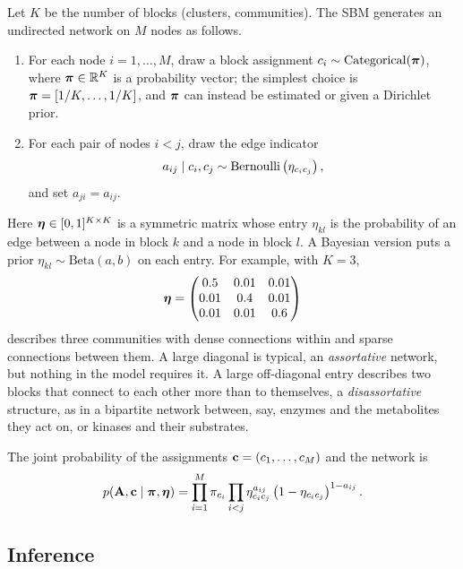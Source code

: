 Let $K$ be the number of blocks (clusters, communities). The SBM generates an undirected network on $M$ nodes as follows.
\begin{enumerate}
  \item For each node $i=1,\dots,M$, draw a block assignment $c_i\sim\operatorname{Categorical}(\boldsymbol{\pi})$, where $\boldsymbol{\pi}\in\mathbb{R}^K$ is a probability vector; the simplest choice is $\boldsymbol{\pi}=[1/K,\dots,1/K]$, and $\boldsymbol{\pi}$ can instead be estimated or given a Dirichlet prior.
  \item For each pair of nodes $i<j$, draw the edge indicator
  \begin{equation}
    a_{ij}\mid c_i,c_j \sim \operatorname{Bernoulli}\left(\eta_{c_ic_j}\right),
  \end{equation}
  and set $a_{ji}=a_{ij}$.
\end{enumerate}
Here $\boldsymbol{\eta}\in[0,1]^{K\times K}$ is a symmetric matrix whose entry $\eta_{kl}$ is the probability of an edge between a node in block $k$ and a node in block $l$. A Bayesian version puts a prior $\eta_{kl}\sim\text{Beta}(a,b)$ on each entry. For example, with $K=3$,
\begin{equation}
  \boldsymbol{\eta} = \begin{pmatrix} 0.5 & 0.01 & 0.01\\ 0.01 & 0.4 & 0.01\\ 0.01 & 0.01 & 0.6\end{pmatrix}
\end{equation}
describes three communities with dense connections within and sparse connections between them. A large diagonal is typical, an \emph{assortative} network, but nothing in the model requires it. A large off-diagonal entry describes two blocks that connect to each other more than to themselves, a \emph{disassortative} structure, as in a bipartite network between, say, enzymes and the metabolites they act on, or kinases and their substrates.

The joint probability of the assignments $\mathbf{c}=(c_1,\dots,c_M)$ and the network is
\begin{equation}
  p(\mathbf{A},\mathbf{c}\mid\boldsymbol{\pi},\boldsymbol{\eta}) = \prod_{i=1}^M\pi_{c_i}\prod_{i<j}\eta_{c_ic_j}^{a_{ij}}\left(1-\eta_{c_ic_j}\right)^{1-a_{ij}}.
  \label{eq:sbm_joint}
\end{equation}

\subsection{Inference}

